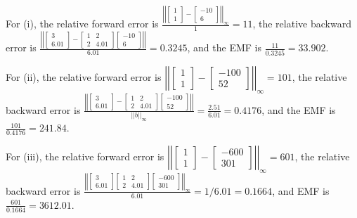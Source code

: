 \documentclass[10pt,letterpaper]{article}
\begin{document}
\begin{enumerate}
For (i), the relative forward error is $\frac{\left|\left| \begin{bmatrix}
1 \\
1 
\end{bmatrix} - \begin{bmatrix}
-10 \\
6 
\end{bmatrix} \right|\right|_{\infty}}{1} = 11$, the relative backward error is $\frac{\left|\left| \begin{bmatrix}
3 \\
6.01 
\end{bmatrix} - \begin{bmatrix}
1 & 2 \\
2 & 4.01 
\end{bmatrix}\begin{bmatrix}
-10 \\
6 
\end{bmatrix} \right|\right|}{6.01} = 0.3245$, and the EMF is $\frac{11}{0.3245} = 33.902$. 

For (ii), the relative forward error is $\left|\left| \begin{bmatrix}
1 \\
1
\end{bmatrix} - \begin{bmatrix}
-100 \\
52 
\end{bmatrix} \right|\right|_{\infty} = 101$, the relative backward error is $\frac{\left|\left| \begin{bmatrix}
3 \\
6.01 
\end{bmatrix} - \begin{bmatrix}
1 & 2 \\
2 & 4.01 
\end{bmatrix}\begin{bmatrix}
-100 \\
52 
\end{bmatrix} \right|\right|}{||b||_{\infty}} = \frac{2.51}{6.01} = 0.4176$, and the EMF is $\frac{101}{0.4176} = 241.84$. 

For (iii), the relative forward error is $\left|\left| \begin{bmatrix}
1 \\
1 
\end{bmatrix} - \begin{bmatrix}
-600 \\
301 
\end{bmatrix} \right|\right|_{\infty} = 601$, the relative backward error is $\frac{\left|\left| \begin{bmatrix}
3 \\
6.01 
\end{bmatrix}\begin{bmatrix}
1 & 2 \\
2 & 4.01 
\end{bmatrix}\begin{bmatrix}
-600 \\
301 
\end{bmatrix} \right|\right|_{\infty}}{6.01} = 1/6.01 = 0.1664$, and EMF is $\frac{601}{0.1664} = 3612.01$.


\end{enumerate}
\end{document}
